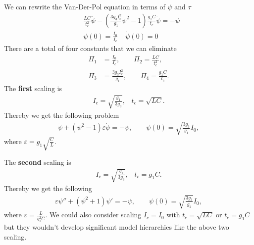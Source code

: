 \documentclass[a4paper]{article}
\newcommand{\eps}{\varepsilon}
\begin{document}
We can rewrite the Van-Der-Pol equation in terms of $\psi$ and $\tau$
\begin{align}
    &\frac{LC}{t_c^2}\ddot{\psi} - \left(\frac{3g_3I_c^2}{g_1}\psi^2 -
    1\right)\frac{g_1C}{t_c}\dot{\psi}= -\psi\\
    &\psi(0) = \frac{I_0}{I_c} \;\;\;\; \dot{\psi}(0) = 0
\end{align}
There are a total of four constants that we can eliminate
\begin{align}
    \Pi_1 &= \frac{I_0}{I_c}, \qquad
    \Pi_2 = \frac{LC}{t_c^2},\nonumber\\
    \Pi_3 &= \frac{3g_3I_c^2}{g_1}, \qquad
    \Pi_4 = \frac{g_1C}{t_c}.
\end{align}
The \textbf{first} scaling is
\begin{align}
    I_c = \sqrt{\frac{g_1}{3g_3}},\;\;\; t_c=\sqrt{LC}.
\end{align}
Thereby we get the following problem
\begin{align}
    \ddot{\psi} + (\psi^2 - 1)\eps \dot{\psi} = -\psi, \qquad \psi(0) =
    \sqrt{\frac{3g_3}{g_1}}I_0,
\end{align}
where $\eps = g_1\sqrt{\frac{C}{L}}$.

The \textbf{second} scaling is
\begin{align}
    I_c = \sqrt{\frac{g_1}{3g_3}},\;\;\; t_c=g_1C.
\end{align}
Thereby we get the following
\begin{align}
    \eps \psi'' +(\psi^2 +1)\psi' = -\psi, \qquad \psi(0) =
    \sqrt{\frac{3g_3}{g_1}}I_0,
\end{align}
where $\eps = \frac{L}{g_1^2C}$. We could also consider scaling $I_c = I_0$
with $t_c = \sqrt{LC}$ or $t_c = g_1C$ but they wouldn't develop significant
model hierarchies like the above two scaling.
\end{document}
